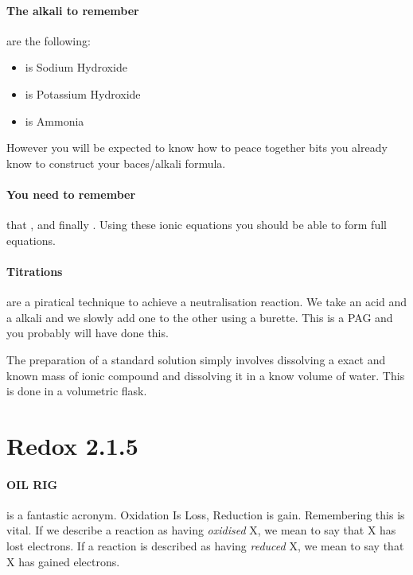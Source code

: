 	\paragraph{The alkali to remember} are the following:
	\begin{itemize}
		\item {} is Sodium Hydroxide
		\item {} is Potassium Hydroxide
		\item {} is Ammonia
	\end{itemize}
	However you will be expected to know how to peace together bits you already know to construct your baces/alkali formula.
	
	\paragraph{You need to remember} that ,  and finally .
	Using these ionic equations you should be able to form full equations.
	
	\paragraph{Titrations} are a piratical technique to achieve a neutralisation reaction.
	We take an acid and a alkali and we slowly add one to the other using a burette.
	This is a PAG and you probably will have done this.
	
	The preparation of a standard solution simply involves dissolving a exact and known mass of ionic compound and dissolving it in a know volume of water.
	This is done in a volumetric flask.
	
\section{Redox 2.1.5}

	\paragraph{OIL RIG} is a fantastic acronym.
	Oxidation Is Loss, Reduction is gain.
	Remembering this is vital.
	If we describe a reaction as having \textit{oxidised} X, we mean to say that X has lost electrons.
	If a reaction is described as having \textit{reduced} X, we mean to say that X has gained electrons.
	
